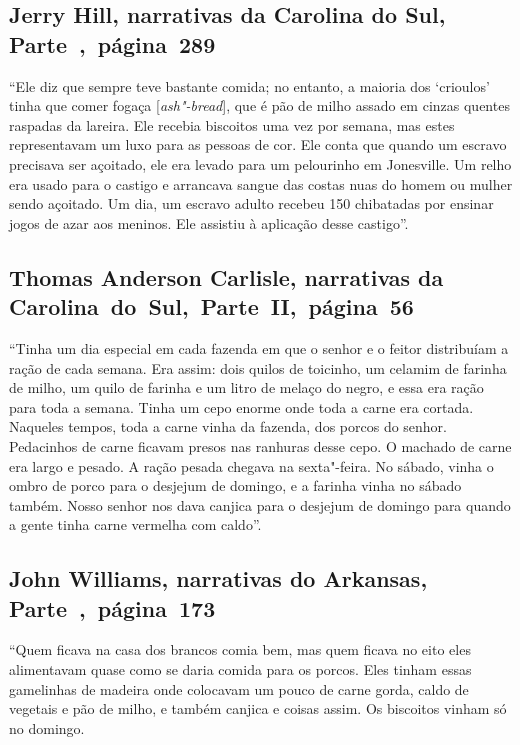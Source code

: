 \subsection{Jerry Hill, narrativas da Carolina do Sul, Parte~,~página~289}
\label{ref145}

``Ele diz que sempre teve bastante comida; no entanto, a maioria dos
`crioulos' tinha que comer fogaça {[}\emph{ash"-bread}{]}, que é pão de milho
assado em cinzas quentes raspadas da lareira. Ele recebia biscoitos uma
vez por semana, mas estes representavam um luxo para as pessoas de cor.
Ele conta que quando um escravo precisava ser açoitado, ele era levado
para um pelourinho em Jonesville. Um relho era usado para o castigo e
arrancava sangue das costas nuas do homem ou mulher sendo açoitado. Um
dia, um escravo adulto recebeu 150 chibatadas por ensinar jogos de azar
aos meninos. Ele assistiu à aplicação desse castigo''.

\subsection{Thomas Anderson Carlisle, narrativas da Carolina~do~Sul,~Parte~II,~página~56}

``Tinha um dia especial em cada fazenda em que o senhor e o feitor
distribuíam a ração de cada semana. Era assim: dois quilos de toicinho,
um celamim de farinha de milho, um quilo de farinha e um litro de melaço
do negro, e essa era ração para toda a semana. Tinha um cepo enorme onde
toda a carne era cortada. Naqueles tempos, toda a carne vinha da
fazenda, dos porcos do senhor. Pedacinhos de carne ficavam presos nas
ranhuras desse cepo. O machado de carne era largo e pesado. A ração
pesada chegava na sexta"-feira. No sábado, vinha o ombro de porco para o
desjejum de domingo, e a farinha vinha no sábado também. Nosso senhor
nos dava canjica para o desjejum de domingo para quando a gente tinha
carne vermelha com caldo''.

\subsection{John Williams, narrativas do Arkansas, Parte~,~página~173}
\label{ref291}

``Quem ficava na casa dos brancos comia bem, mas quem ficava no eito
eles alimentavam quase como se daria comida para os porcos. Eles tinham
essas gamelinhas de madeira onde colocavam um pouco de carne gorda,
caldo de vegetais e pão de milho, e também canjica e coisas assim. Os
biscoitos vinham só no domingo.

